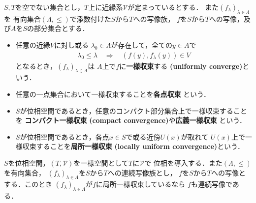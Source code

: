 	\begin{screen}
		\begin{dfn}[一様収束]
			$S,T$を空でない集合とし，$T$上に近縁系$\mathscr{V}$が定まっているとする．
			また$(f_\lambda)_{\lambda \in \Lambda}$を
			有向集合$(\Lambda,\leq)$で添数付けた$S$から$T$への写像族，
			$f$を$S$から$T$への写像，及び$A$を$S$の部分集合とする．
			\begin{itemize}
				\item 任意の近縁$V$に対し或る
					$\lambda_0 \in \Lambda$が存在して，全ての$y \in A$で
					\begin{align}
						\lambda_0 \leq \lambda \quad \Longrightarrow \quad
						(f(y),f_\lambda(y)) \in V
					\end{align}
					となるとき，$(f_\lambda)_{\lambda \in \Lambda}$は
					$A$上で$f$に{\bf 一様収束}する
					{\bf (uniformly converge)}という．
					
				\item 任意の一点集合において一様収束することを{\bf 各点収束}
					という．
				
				\item $S$が位相空間であるとき，任意のコンパクト部分集合上で一様収束することを
					{\bf コンパクト一様収束}
					{\bf (compact convergence)}や{\bf 広義一様収束}
					という．
					
				\item $S$が位相空間であるとき，各点$x \in S$で或る近傍$U(x)$が取れて
					$U(x)$上で一様収束することを{\bf 局所一様収束}
					{\bf (locally uniform convergence)}という．
			\end{itemize}
		\end{dfn}
	\end{screen}
	
	\begin{screen}
		\begin{thm}[連続写像が局所一様収束するなら極限写像も連続]
			$S$を位相空間，$(T,\mathscr{V})$を一様空間として$T$に$\mathscr{V}$で
			位相を導入する．また$(\Lambda,\leq)$を有向集合，
			$(f_\lambda)_{\lambda \in \Lambda}$を$S$から$T$への連続写像族とし，
			$f$を$S$から$T$への写像とする．このとき
			$(f_\lambda)_{\lambda \in \Lambda}$が$f$に局所一様収束しているなら
			$f$も連続写像である．
		\end{thm}
	\end{screen}
	
